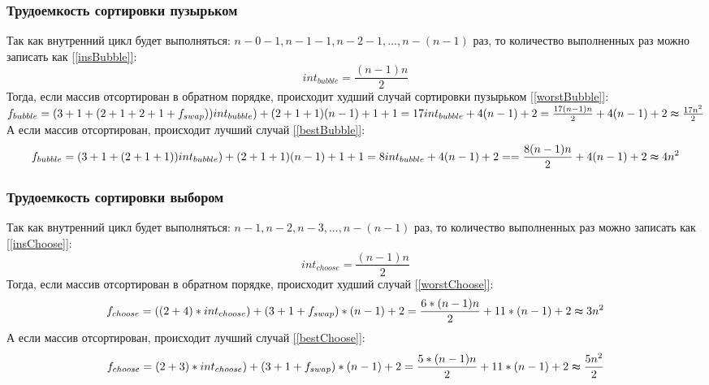 \documentclass{article}
\begin{document}
		\subsubsection{Трудоемкость сортировки пузырьком}
		Так как внутренний цикл будет выполняться: $n-0-1,n-1-1,n-2-1,...,n-(n-1)$ раз, то количество выполненных раз можно записать как \hyperref[insBubble]{[\ref{insBubble}]}:
\begin{equation}\label{insBubble}
	int_{bubble}=\frac{(n-1)n}{2}
\end{equation}
	Тогда, если массив отсортирован в обратном порядке, происходит худший случай сортировки пузырьком \hyperref[worstBubble]{[\ref{worstBubble}]}:
	\\
	$
		f_{bubble} = (3 + 1 + (2 + 1 + 2 + 1 + f_{swap}))int_{bubble}) + (2 + 1 + 1)(n - 1)
		 + 1 + 1 = 17int_{bubble} + 4(n - 1) + 2 = \newline
		\frac{17(n-1)n}{2} + 4(n - 1) + 2 \thickapprox \frac{17n^2}{2}
	$\begin{equation}\label{worstBubble}\end{equation}
	А если массив отсортирован, происходит лучший случай \hyperref[bestBubble]{[\ref{bestBubble}]}:
	\begin{equation}\label{bestBubble}
		f_{bubble} = (3 + 1 + (2 + 1 + 1)) int_{bubble}) + (2 + 1 + 1)(n - 1) + 1 + 1 = 8 int_{bubble} + 4(n - 1) + 2 =
		= \frac{8(n-1)n}{2} + 4(n - 1) + 2 \thickapprox 4n^2
	\end{equation}
	

	\subsubsection{Трудоемкость сортировки выбором}
		Так как внутренний цикл будет выполняться: $n-1,n-2,n-3,...,n-(n-1)$ раз, то количество выполненных раз можно записать как \hyperref[insChoose]{[\ref{insChoose}]}:\begin{equation}\label{insChoose}
	int_{choose}=\frac{(n-1)n}{2}
\end{equation}
	Тогда, если массив отсортирован в обратном порядке, происходит худший случай \hyperref[worstChoose]{[\ref{worstChoose}]}:
	\begin{equation}\label{worstChoose}
		f_{choose} = ((2 + 4) * int_{choose}) + (3 + 1 + f_{swap}) * (n - 1) + 2 =
		 \frac{6 * (n-1)n}{2} + 11 * (n - 1) + 2 \thickapprox 3n^2
	\end{equation}
	А если массив отсортирован, происходит лучший случай \hyperref[bestChoose]{[\ref{bestChoose}]}:
	\begin{equation}\label{bestChoose}
		f_{choose} = (2 + 3) * int_{choose}) + (3 + 1 + f_{swap}) * (n - 1) + 2 =
		\frac{5 * (n-1)n}{2} + 11 * (n - 1) + 2 \thickapprox \frac{5n^2}{2}
	\end{equation}
\end{document}
